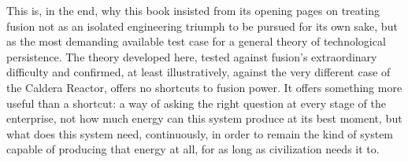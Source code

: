 This is, in the end, why this book insisted from its opening pages on treating fusion not as an isolated engineering triumph to be pursued for its own sake, but as the most demanding available test case for a general theory of technological persistence. The theory developed here, tested against fusion's extraordinary difficulty and confirmed, at least illustratively, against the very different case of the Caldera Reactor, offers no shortcuts to fusion power. It offers something more useful than a shortcut: a way of asking the right question at every stage of the enterprise, not how much energy can this system produce at its best moment, but what does this system need, continuously, in order to remain the kind of system capable of producing that energy at all, for as long as civilization needs it to.
